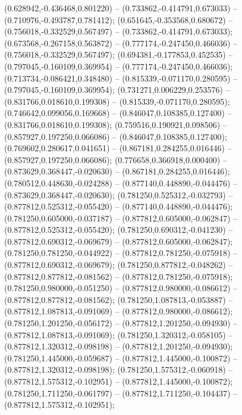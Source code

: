  (0.628942,-0.436468,0.801220) -- (0.733862,-0.414791,0.673033) -- (0.710976,-0.493787,0.781412);
 (0.651645,-0.353568,0.680672) -- (0.756018,-0.332529,0.567497) -- (0.733862,-0.414791,0.673033);
 (0.673568,-0.267158,0.563872) -- (0.777174,-0.247450,0.466036) -- (0.756018,-0.332529,0.567497);
 (0.694381,-0.177853,0.452535) -- (0.797045,-0.160109,0.369954) -- (0.777174,-0.247450,0.466036);
 (0.713734,-0.086421,0.348480) -- (0.815339,-0.071170,0.280595) -- (0.797045,-0.160109,0.369954);
 (0.731271,0.006229,0.253576) -- (0.831766,0.018610,0.199308) -- (0.815339,-0.071170,0.280595);
 (0.746642,0.099056,0.169668) -- (0.846047,0.108385,0.127400) -- (0.831766,0.018610,0.199308);
 (0.759516,0.190921,0.098506) -- (0.857927,0.197250,0.066086) -- (0.846047,0.108385,0.127400);
 (0.769602,0.280617,0.041651) -- (0.867181,0.284255,0.016446) -- (0.857927,0.197250,0.066086);
 (0.776658,0.366918,0.000400) -- (0.873629,0.368447,-0.020630) -- (0.867181,0.284255,0.016446);
 (0.780512,0.448630,-0.024288) -- (0.877140,0.448890,-0.044476) -- (0.873629,0.368447,-0.020630);
 (0.781250,0.525312,-0.032793) -- (0.877812,0.525312,-0.055420) -- (0.877140,0.448890,-0.044476);
 (0.781250,0.605000,-0.037187) -- (0.877812,0.605000,-0.062847) -- (0.877812,0.525312,-0.055420);
 (0.781250,0.690312,-0.041230) -- (0.877812,0.690312,-0.069679) -- (0.877812,0.605000,-0.062847);
 (0.781250,0.781250,-0.044922) -- (0.877812,0.781250,-0.075918) -- (0.877812,0.690312,-0.069679);
 (0.781250,0.877812,-0.048262) -- (0.877812,0.877812,-0.081562) -- (0.877812,0.781250,-0.075918);
 (0.781250,0.980000,-0.051250) -- (0.877812,0.980000,-0.086612) -- (0.877812,0.877812,-0.081562);
 (0.781250,1.087813,-0.053887) -- (0.877812,1.087813,-0.091069) -- (0.877812,0.980000,-0.086612);
 (0.781250,1.201250,-0.056172) -- (0.877812,1.201250,-0.094930) -- (0.877812,1.087813,-0.091069);
 (0.781250,1.320312,-0.058105) -- (0.877812,1.320312,-0.098198) -- (0.877812,1.201250,-0.094930);
 (0.781250,1.445000,-0.059687) -- (0.877812,1.445000,-0.100872) -- (0.877812,1.320312,-0.098198);
 (0.781250,1.575312,-0.060918) -- (0.877812,1.575312,-0.102951) -- (0.877812,1.445000,-0.100872);
 (0.781250,1.711250,-0.061797) -- (0.877812,1.711250,-0.104437) -- (0.877812,1.575312,-0.102951);
